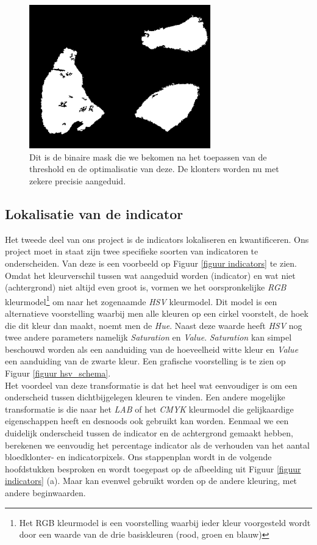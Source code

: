 \documentclass[a4paper,kulak]{kulakarticle}
\begin{document}
\begin{figure}[H]
	\centering
	\includegraphics[width=0.7\textwidth]{lichte_kleuring_binair}
	
	\caption{Dit is de binaire mask die we bekomen na het toepassen van de threshold en de optimalisatie van deze. De klonters worden nu met zekere precisie aangeduid.}
	\label{figuur lichte_kleuring_binair}
\end{figure}


\subsection{Lokalisatie van de indicator}
Het tweede deel van ons project is de indicators lokaliseren en kwantificeren. Ons project moet in staat zijn twee specifieke soorten van indicatoren te onderscheiden. Van deze is een voorbeeld op Figuur \ref{figuur indicators} te zien. Omdat het kleurverschil tussen wat aangeduid worden (indicator) en wat niet (achtergrond) niet altijd even groot is, vormen we het oorspronkelijke \textit{RGB} kleurmodel\footnote{Het RGB kleurmodel is een voorstelling waarbij ieder kleur voorgesteld wordt door een waarde van de drie basiskleuren (rood, groen en blauw)} om naar het zogenaamde \textit{HSV} kleurmodel. Dit model is een alternatieve voorstelling waarbij men alle kleuren op een cirkel voorstelt, de hoek die dit kleur dan maakt, noemt men de \textit{Hue}. Naast deze waarde heeft \textit{HSV} nog twee andere parameters namelijk \textit{Saturation} en \textit{Value}. \textit{Saturation} kan simpel beschouwd worden als een aanduiding van de hoeveelheid witte kleur en \textit{Value} een aanduiding van de zwarte kleur. Een grafische voorstelling is te zien op Figuur \ref{figuur hsv_schema}.\\
Het voordeel van deze transformatie is dat het heel wat eenvoudiger is om een onderscheid tussen dichtbijgelegen kleuren te vinden. Een andere mogelijke transformatie is die naar het \textit{LAB} of het \textit{CMYK} kleurmodel die gelijkaardige eigenschappen heeft en desnoods ook gebruikt kan worden. Eenmaal we een duidelijk onderscheid tussen de indicator en de achtergrond gemaakt hebben, berekenen we eenvoudig het percentage indicator als de verhouden van het aantal bloedklonter- en indicatorpixels. Ons stappenplan wordt in de volgende hoofdstukken besproken en wordt toegepast op de afbeelding uit Figuur \ref{figuur indicators} (a). Maar kan evenwel gebruikt worden op de andere kleuring, met andere beginwaarden.
\end{document}
